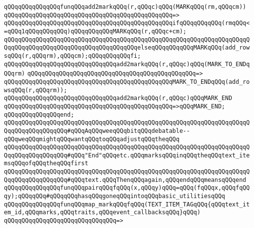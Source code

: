 \verb|qQQqqQQqqQQqqQQqfunqQQqadd2markqQQq(r,qQQqc)qQQq(MARKqQQq(rm,qQQqcm))|\newline
\verb|qQQqqQQqqQQqqQQqqQQqqQQqqQQqqQQqqQQqqQQqqQQqqQQq=>|\newline
\verb|qQQqqQQqqQQqqQQqqQQqqQQqqQQqqQQqqQQqqQQqqQQqqQQqifqQQqqQQqqQQq(rmqQQq<=qQQq1qQQqqQQqqQQq)qQQqqQQqqQQqMARKqQQq(r,qQQqc+cm);|\newline
\verb|qQQqqQQqqQQqqQQqqQQqqQQqqQQqqQQqqQQqqQQqqQQqqQQqqQQqqQQqqQQqqQQqqQQqqQQqqQQqqQQqqQQqqQQqqQQqqQQqqQQqqQQqqQQqelseqQQqqQQqqQQqMARKqQQq(add_rowsqQQq(r,qQQqrm),qQQqcm);qQQqqQQqqQQqfi;|\newline
\newline
\verb|qQQqqQQqqQQqqQQqqQQqqQQqqQQqqQQqadd2markqQQq(r,qQQqc)qQQq(MARK_TO_ENDqQQqrm)|\newline
\verb|qQQqqQQqqQQqqQQqqQQqqQQqqQQqqQQqqQQqqQQqqQQqqQQq=>|\newline
\verb|qQQqqQQqqQQqqQQqqQQqqQQqqQQqqQQqqQQqqQQqqQQqqQQqMARK_TO_ENDqQQq(add_rowsqQQq(r,qQQqrm));|\newline
\newline
\verb|qQQqqQQqqQQqqQQqqQQqqQQqqQQqqQQqadd2markqQQq(r,qQQqc)qQQqMARK_END|\newline
\verb|qQQqqQQqqQQqqQQqqQQqqQQqqQQqqQQqqQQqqQQqqQQqqQQq=>qQQqMARK_END;|\newline
\verb|qQQqqQQqqQQqqQQqend;|\newline
\verb|qQQqqQQqqQQqqQQqqQQqqQQqqQQqqQQqqQQqqQQqqQQqqQQqqQQqqQQqqQQqqQQqqQQqqQQqqQQqqQQqqQQqqQQq#qQQqAqQQqweeqQQqbitqQQqdebatable--qQQqweqQQqmightqQQqwantqQQqtoqQQqadjustqQQqtheqQQq|\newline
\verb|qQQqqQQqqQQqqQQqqQQqqQQqqQQqqQQqqQQqqQQqqQQqqQQqqQQqqQQqqQQqqQQqqQQqqQQqqQQqqQQqqQQqqQQq#qQQq"End"qQQqetc.qQQqmarksqQQqinqQQqtheqQQqtext_itemsqQQqofqQQqtheqQQqfirst|\newline
\verb|qQQqqQQqqQQqqQQqqQQqqQQqqQQqqQQqqQQqqQQqqQQqqQQqqQQqqQQqqQQqqQQqqQQqqQQqqQQqqQQqqQQqqQQq#qQQqtext.qQQqThenqQQqagain,qQQqendqQQqmeansqQQqend|\newline
\newline
\verb|qQQqqQQqqQQqqQQqfunqQQqpairqQQqfqQQq(x,qQQqy)qQQq=qQQq(fqQQqx,qQQqfqQQqy);qQQqqQQq#qQQqqQQqhasqQQqgoneqQQqintoqQQqbasic_utilitiesqQQq|\newline
\newline
\verb|qQQqqQQqqQQqqQQqfunqQQqmap_markqQQqfqQQq(TEXT_ITEM_TAGqQQq{qQQqtext_item_id,qQQqmarks,qQQqtraits,qQQqevent_callbacksqQQq}qQQq)|\newline
\verb|qQQqqQQqqQQqqQQqqQQqqQQqqQQqqQQq=>|\newline
